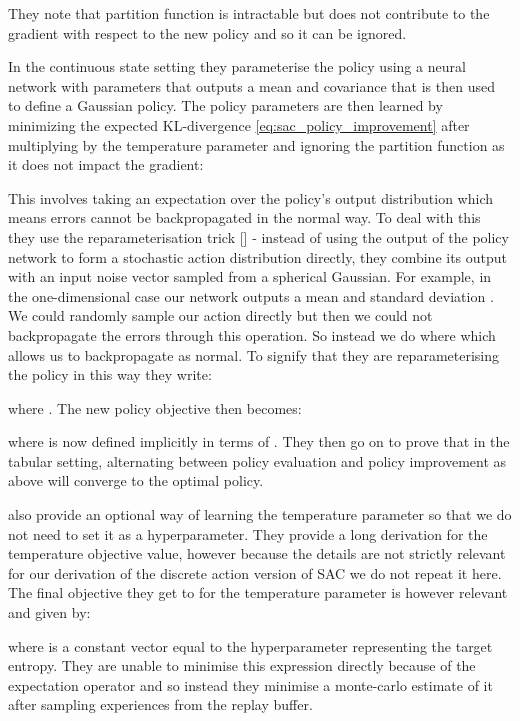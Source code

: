 \documentclass{article}
\begin{document}
They note that partition function  is intractable but does not contribute to the gradient with respect to the new policy and so it can be ignored. 

In the continuous state setting they parameterise the policy  using a neural network with parameters  that outputs a mean and covariance that is then used to define a Gaussian policy. The policy parameters are then learned by minimizing the expected KL-divergence \eqref{eq:sac_policy_improvement} after multiplying by the temperature parameter  and ignoring the partition function  as it does not impact the gradient:



This involves taking an expectation over the policy's output distribution which means errors cannot be backpropagated in the normal way. To deal with this they use the reparameterisation trick [\cite{reparatrick}] - instead of using the output of the policy network to form a stochastic action distribution directly, they combine its output with an input noise vector sampled from a spherical Gaussian. For example, in the one-dimensional case our network outputs a mean  and standard deviation . We could randomly sample our action directly  but then we could not backpropagate the errors through this operation. So instead we do  where  which allows us to backpropagate as normal. To signify that they are reparameterising the policy in this way they write:



where . The new policy objective then becomes:



where  is now defined implicitly in terms of . They then go on to prove that in the tabular setting, alternating between policy evaluation and policy improvement as above will converge to the optimal policy. 

\citet{SACapplications} also provide an optional way of learning the temperature parameter so that we do not need to set it as a hyperparameter. They provide a long derivation for the temperature objective value, however because the details are not strictly relevant for our derivation of the discrete action version of SAC we do not repeat it here. The final objective they get to for the temperature parameter is however relevant and given by:



where  is a constant vector equal to the hyperparameter representing the target entropy.  They are unable to minimise this expression directly because of the expectation operator and so instead they minimise a monte-carlo estimate of it after sampling experiences from the replay buffer. 
\end{document}
